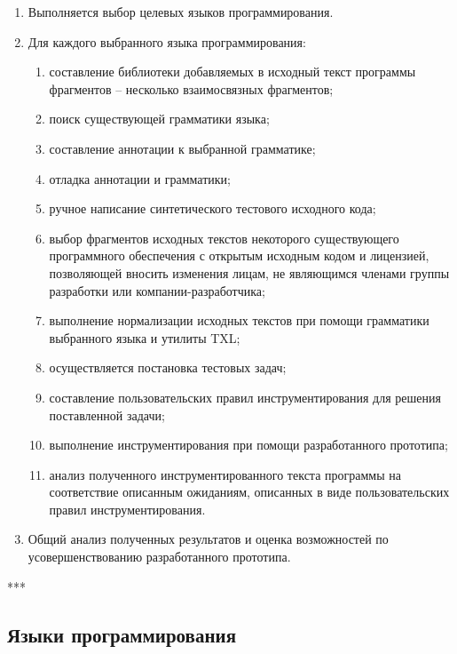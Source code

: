 \begin{enumerate}[label=\arabic*]
  \item Выполняется выбор целевых языков программирования.
  \item Для каждого выбранного языка программирования:
    \begin{enumerate}[label*=.\arabic*]
      \item составление библиотеки добавляемых в исходный текст программы фрагментов -- несколько взаимосвязных фрагментов;

      \item поиск существующей грамматики языка;
      \item составление аннотации к выбранной грамматике;
      \item отладка аннотации и грамматики;

      \item ручное написание синтетического тестового исходного кода;
      \item выбор фрагментов исходных текстов некоторого существующего программного обеспечения с открытым исходным кодом и лицензией, позволяющей вносить изменения лицам, не являющимся членами группы разработки или компании-разработчика;
      \item выполнение нормализации исходных текстов при помощи грамматики выбранного языка и утилиты TXL;

      \item осуществляется постановка тестовых задач;
      \item составление пользовательских правил инструментирования для решения поставленной задачи;

      \item выполнение инструментирования при помощи разработанного прототипа;
      \item анализ полученного инструментированного текста программы на соответствие описанным ожиданиям, описанных в виде пользовательских правил инструментирования.
    \end{enumerate}

  \item Общий анализ полученных результатов и оценка возможностей по усовершенствованию разработанного прототипа.
\end{enumerate}

***

\subsection{Языки программирования}

